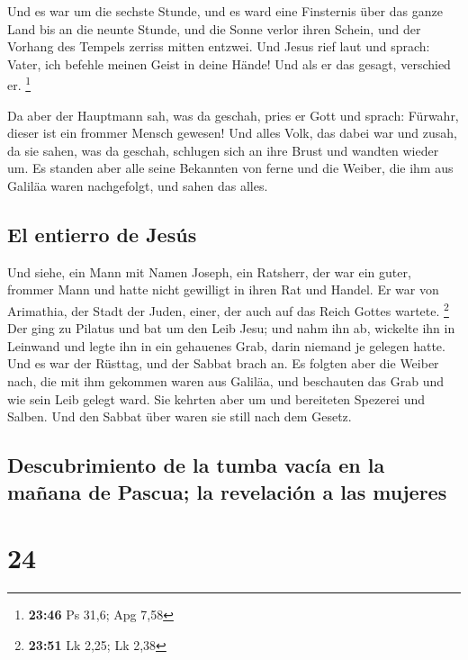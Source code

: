  Und es war um die sechste Stunde, und es ward eine
Finsternis über das ganze Land bis an die neunte Stunde, 
und die Sonne verlor ihren Schein, und der Vorhang des Tempels zerriss
mitten entzwei.  Und Jesus rief laut und sprach: Vater,
ich befehle meinen Geist in deine Hände! Und als er das gesagt,
verschied er. \footnote{\textbf{23:46} Ps 31,6; Apg 7,58}

 Da aber der Hauptmann sah, was da geschah, pries er Gott
und sprach: Fürwahr, dieser ist ein frommer Mensch gewesen!
 Und alles Volk, das dabei war und zusah, da sie sahen,
was da geschah, schlugen sich an ihre Brust und wandten wieder um.
 Es standen aber alle seine Bekannten von ferne und die
Weiber, die ihm aus Galiläa waren nachgefolgt, und sahen das alles.

\hypertarget{el-entierro-de-jesuxfas}{%
\subsection{El entierro de Jesús}\label{el-entierro-de-jesuxfas}}

 Und siehe, ein Mann mit Namen Joseph, ein Ratsherr, der
war ein guter, frommer Mann  und hatte nicht gewilligt in
ihren Rat und Handel. Er war von Arimathia, der Stadt der Juden, einer,
der auch auf das Reich Gottes wartete. \footnote{\textbf{23:51} Lk 2,25;
  Lk 2,38}  Der ging zu Pilatus und bat um den Leib Jesu;
 und nahm ihn ab, wickelte ihn in Leinwand und legte ihn
in ein gehauenes Grab, darin niemand je gelegen hatte. 
Und es war der Rüsttag, und der Sabbat brach an.  Es
folgten aber die Weiber nach, die mit ihm gekommen waren aus Galiläa,
und beschauten das Grab und wie sein Leib gelegt ward. 
Sie kehrten aber um und bereiteten Spezerei und Salben. Und den Sabbat
über waren sie still nach dem Gesetz.

\hypertarget{descubrimiento-de-la-tumba-vacuxeda-en-la-mauxf1ana-de-pascua-la-revelaciuxf3n-a-las-mujeres}{%
\subsection{Descubrimiento de la tumba vacía en la mañana de Pascua; la
revelación a las
mujeres}\label{descubrimiento-de-la-tumba-vacuxeda-en-la-mauxf1ana-de-pascua-la-revelaciuxf3n-a-las-mujeres}}

\hypertarget{section-23}{%
\section{24}\label{section-23}}

